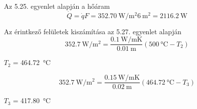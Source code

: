 Az 5.25. egyenlet alapján a hőáram 
\begin{equation}
\dot{Q} = \dot{q} F = \SI{352.70}{\watt\per\meter\squared} \SI{6}{\meter\squared} = \SI{2116.2}{\watt}
\end{equation}

Az érintkező felületek kiszámítása az 5.27. egyenlet alapján
\begin{equation}
\SI{352.7}{\watt\per\meter\squared} = \frac{\SI{0.1}{\watt\per\meter\kelvin}}{\SI{0.01}{\meter}} (\SI{500}{\celsius} - T_2) 
\end{equation}
\begin{center}
	$T_2$ = \SI{464.72}{\celsius}
\end{center}

\begin{equation}
\SI{352.7}{\watt\per\meter\squared} = \frac{\SI{0.15}{\watt\per\meter\kelvin}}{\SI{0.02}{\meter}} (\SI{464,72}{\celsius} - T_3) 
\end{equation}
\begin{center}
	$T_3$ = \SI{417.80}{\celsius}
\end{center}

\pagebreak
